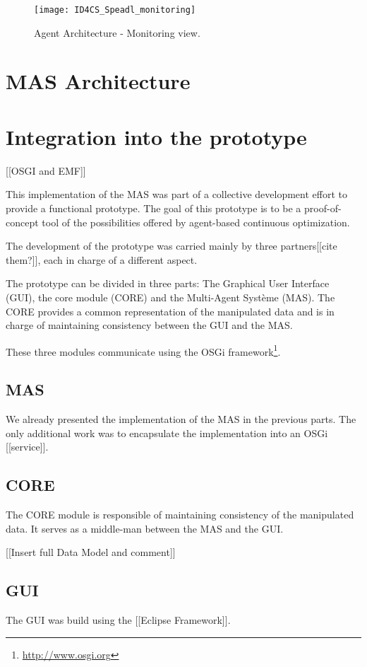 \begin{figure}
\centering
\texttt{[image: ID4CS\_Speadl\_monitoring]}
\caption{Agent Architecture - Monitoring view.}
\label{Arch-monitor}
\end{figure}

\section{MAS Architecture}

\section{Integration into the prototype}

[[OSGI and EMF]]

This implementation of the MAS was part of a collective development effort to provide a functional prototype. The goal of this prototype is to be a proof-of-concept tool of the possibilities offered by agent-based continuous optimization.

The development of the prototype was carried mainly by three partners[[cite them?]], each in charge of a different aspect.

The prototype can be divided in three parts: The Graphical User Interface (GUI), the core module (CORE) and the Multi-Agent Système (MAS). The CORE provides a common representation of the manipulated data and is in charge of maintaining consistency between the GUI and the MAS.

These three modules communicate using the OSGi framework\footnote{\url{http://www.osgi.org}}.

\subsection{MAS}

We already presented the implementation of the MAS in the previous parts. The only additional work was to encapsulate the implementation into an OSGi [[service]].

\subsection{CORE}

The CORE module is responsible of maintaining consistency of the manipulated data. It serves as a middle-man between the MAS and the GUI.

[[Insert full Data Model and comment]]

\subsection{GUI}

The GUI was build using the [[Eclipse Framework]].


